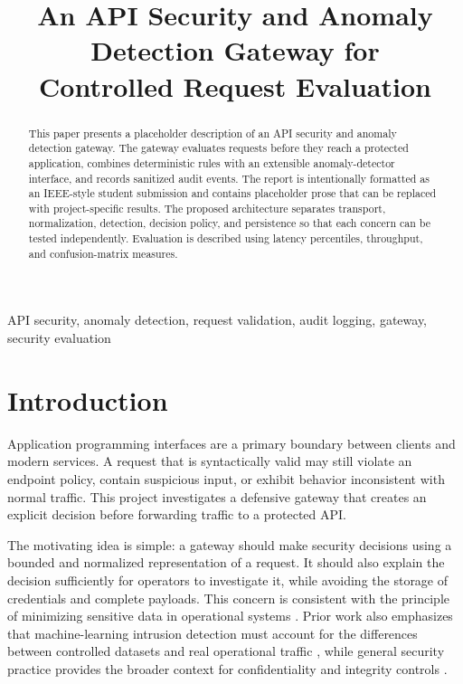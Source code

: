 \documentclass[conference]{IEEEtran}
\title{An API Security and Anomaly Detection Gateway for\\
Controlled Request Evaluation}
\author{\IEEEauthorblockN{Student One, Student Two, and Student Three}
\IEEEauthorblockA{Department of Computer Science\\
University Name\\
City, State, USA\\
\{student.one, student.two, student.three\}@university.edu}}
\begin{document}
\maketitle
\thispagestyle{plain}

\begin{abstract}
This paper presents a placeholder description of an API security and anomaly
detection gateway. The gateway evaluates requests before they reach a protected
application, combines deterministic rules with an extensible anomaly-detector
interface, and records sanitized audit events. The report is intentionally
formatted as an IEEE-style student submission and contains placeholder prose
that can be replaced with project-specific results. The proposed architecture
separates transport, normalization, detection, decision policy, and persistence
so that each concern can be tested independently. Evaluation is described using
latency percentiles, throughput, and confusion-matrix measures.
\end{abstract}

\begin{IEEEkeywords} %
API security, anomaly detection, request validation, audit logging, gateway,
security evaluation
\end{IEEEkeywords}

\section{Introduction}
Application programming interfaces are a primary boundary between clients and
modern services. A request that is syntactically valid may still violate an
endpoint policy, contain suspicious input, or exhibit behavior inconsistent
with normal traffic. This project investigates a defensive gateway that creates
an explicit decision before forwarding traffic to a protected API.

The motivating idea is simple: a gateway should make security decisions using
a bounded and normalized representation of a request. It should also explain
the decision sufficiently for operators to investigate it, while avoiding the
storage of credentials and complete payloads. This concern is consistent with
the principle of minimizing sensitive data in operational systems
\cite{nist80053,owaspapi}. Prior work also emphasizes that machine-learning
intrusion detection must account for the differences between controlled
datasets and real operational traffic \cite{sommer2010outside}, while general
security practice provides the broader context for confidentiality and
integrity controls \cite{stallings2020}.
\end{document}
